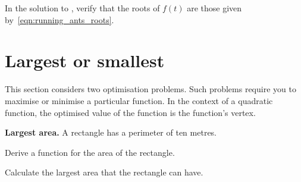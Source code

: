 \documentclass[a4paper,oneside,12pt]{article}
\begin{document}
\begin{exercise}
In the solution to , verify that the roots of
$f(t)$ are those given by~\eqref{eqn:running_ants_roots}.
\end{exercise}



\section{Largest or smallest}

This section considers two optimisation problems.  Such problems
require you to maximise or minimise a particular function.  In the
context of a quadratic function, the optimised value of the function
is the function's vertex.

\begin{example}
\label{eg:largest_area_rectangle}
\textbf{Largest area.}
A rectangle has a perimeter of ten metres.
\begin{packedenum}
\item\label{subex:largest_area_perimeter_area}
  Derive a function for the area of the rectangle.

\item\label{subex:largest_area_of_rectangle}
  Calculate the largest area that the rectangle can have.
\end{packedenum}
\end{example}
\end{document}

